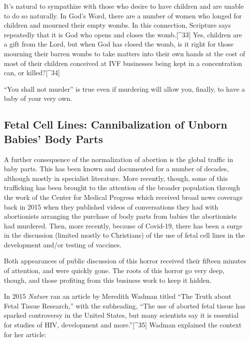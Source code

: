 \documentclass[
]{book}
\begin{document}
It's natural to sympathize with those who desire to have children and are unable to do so naturally. In God's Word, there are a number of women who longed for children and mourned their empty wombs. In this connection, Scripture says repeatedly that it is God who opens and closes the womb.{[}\^{}33{]} Yes, children are a gift from the Lord, but when God has closed the womb, is it right for those mourning their barren wombs to take matters into their own hands at the cost of most of their children conceived at IVF businesses being kept in a concentration can, or killed?{[}\^{}34{]}

``You shall not murder'' is true even if murdering will allow you, finally, to have a baby of your very own.

\hypertarget{fetal-cell-lines-cannibalization-of-unborn-babies-body-parts}{%
\subsection{Fetal Cell Lines: Cannibalization of Unborn Babies' Body Parts}\label{fetal-cell-lines-cannibalization-of-unborn-babies-body-parts}}

A further consequence of the normalization of abortion is the global traffic in baby parts. This has been known and documented for a number of decades, although mostly in specialist literature. More recently, though, some of this trafficking has been brought to the attention of the broader population through the work of the Center for Medical Progress which received broad news coverage back in 2015 when they published videos of conversations they had with abortionists arranging the purchase of body parts from babies the abortionists had murdered. Then, more recently, because of Covid-19, there has been a surge in the discussion (limited mostly to Christians) of the use of fetal cell lines in the development and/or testing of vaccines.

Both appearances of public discussion of this horror received their fifteen minutes of attention, and were quickly gone. The roots of this horror go very deep, though, and those profiting from this business work to keep it hidden.

In 2015 \emph{Nature} ran an article by Meredith Wadman titled ``The Truth about Fetal Tissue Research,'' with the subheading, ``The use of aborted fetal tissue has sparked controversy in the United States, but many scientists say it is essential for studies of HIV, development and more.''{[}\^{}35{]} Wadman explained the context for her article:
\end{document}
